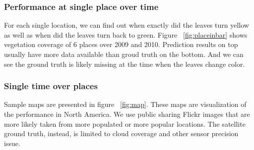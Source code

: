\subsubsection{Performance at single place over time}
For each single location, we can find out when exactly did the leaves turn yellow as well as when
did the leaves turn back to green. 
Figure ~\ref{fig:placeinbar} shows vegetation coverage of 6 places over 2009 and 2010. 
Prediction results on top usually have more data available than groud truth on the bottom. 
And we can see the ground truth is likely missing at the time when the leaves change color. 



\subsubsection{Single time over places}

Sample maps are presented in figure ~\ref{fig:map}. These maps are visualization of the performance
in North America.
We use public sharing Flickr images that are more likely taken from more populated or more popular locations. 
The satellite ground truth, instead, is limited to cloud coverage and other sensor precision issue.





